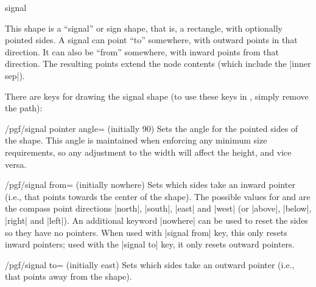 \begin{shape}{signal}

	This shape is a ``signal'' or sign shape, that is, a rectangle, with
	optionally pointed sides. A signal can point ``to'' somewhere, with
	outward points in that direction. It can also be ``from''
	somewhere, with inward points from that direction. The resulting
	points extend the node contents (which include the |inner sep|).
	
\begin{codeexample}[]
\end{codeexample}

	There are \pgfname{} keys for drawing the signal shape (to use these
	keys in \tikzname{}, simply remove the  path):
	
	\begin{key}{/pgf/signal pointer angle= (initially 90)}
		Sets the angle for the pointed sides of the shape. This angle is
		maintained when enforcing any minimum size requirements, so
		any adjustment to the width will affect the height, and vice versa.
	\end{key}
	
	\begin{key}{/pgf/signal from=\space{} (initially nowhere)}
		Sets which sides take an inward pointer (i.e., that points towards the
		center of the shape). The possible values for  and
		 are the compass point directions |north|,
		|south|, |east| and |west| (or |above|, |below|, |right| and |left|).
		An additional keyword |nowhere| can be used to reset the sides so
		they have no pointers. When used with |signal from| key, this only
		resets inward pointers;	used with the |signal to| key, it only
		resets outward pointers.
		
	\end{key}
	
	\begin{key}{/pgf/signal to=\space{} (initially east)}
		Sets which sides take an outward pointer (i.e., that points away from
		the shape).
	\end{key}
	

\end{shape}
